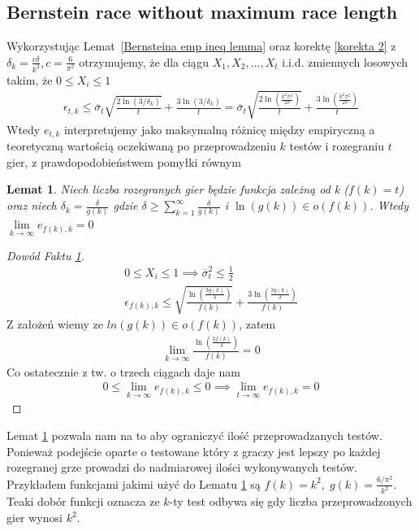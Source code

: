 \documentclass[inzynierska]{pwr_wmat_praca_dyplomowa}
\theoremstyle{plain}
\numberwithin{theorem}{chapter}
\newtheorem{lemma}[theorem]{Lemat}
\theoremstyle{definition}
\numberwithin{theorem}{chapter}
\begin{document}
	\subsection{Bernstein race without maximum race length}
	Wykorzystując Lemat~\ref{Bernsteina emp ineq lemma} oraz korektę \ref{korekta 2} z $\delta_k=\frac{c\delta}{k^2}, c=\frac{6}{\pi^2}$ otrzymujemy, że dla ciągu $X_1,X_2,\dots,X_t$ i.i.d. zmiennych losowych takim, że  $0 \le X_i \le 1$ 
	\begin{align*}
		\label{Bernstein race without maximum race length}
		\epsilon_{t,k} \le \overline{\sigma}_t \sqrt{\frac{2\ln(3/\delta_k)}{t}} + \frac{3  \ln{(3 / \delta_k)}}{t} =
		\overline{\sigma}_t\sqrt{\frac{2\ln(\frac{k^2\pi^2}{2\delta})}{t}} + \frac{3  \ln{(\frac{k^2\pi^2}{2\delta})}}{t}
	\end{align*}
	Wtedy $e_{t,k}$ interpretujemy jako maksymalną różnicę między empiryczną a teoretyczną wartością oczekiwaną po przeprowadzeniu $k$ testów i rozegraniu $t$ gier, z prawdopodobieństwem pomyłki równym 
	\begin{lemma}
		\label{lemma Bernstein race without maximum race length}
		Niech liczba rozegranych gier będzie funkcja zależną od k ($f(k) = t$) oraz niech $\delta_k = \frac{\delta}{g(k)}$
		gdzie $\delta \ge \sum_{k=1}^{\infty} \frac{\delta}{g(k)}$ i $\ln(g(k)) \in o(f(k))$. Wtedy
		$\lim\limits_{k\to\infty} e_{f(k),k} = 0$ 
	\end{lemma}
	\begin{proof}[Dowód Faktu \ref{lemma Bernstein race without maximum race length}]
		\begin{gather*}
			0\le X_i \le 1 \implies \overline{\sigma}_t^2 \le \frac{1}{2}\\
			\epsilon_{f(k), k} \le  \sqrt{\frac{\ln(\frac{3g(k)}{\delta})}{f(k)}} + \frac{3  \ln{(\frac{3g(k)}{\delta})}}{f(k)}
		\end{gather*}
		Z założeń wiemy ze $ln(g(k)) \in o(f(k))$, zatem
		\begin{gather*}
			\lim\limits_{k\to\infty} \frac{  \ln{(\frac{3f(k)}{\delta})}}{f(k)} = 0
		\end{gather*}
		Co ostatecznie z tw. o trzech ciągach daje nam
		\begin{gather*}
			0\le \lim\limits_{k\to\infty} e_{f(k), k} \le 0 \implies \lim\limits_{t\to\infty} e_{f(k), k} = 0
		\end{gather*}
	\end{proof}
	Lemat \ref{lemma Bernstein race without maximum race length} pozwala nam na to aby ograniczyć ilość przeprowadzanych testów. Ponieważ podejście oparte o testowane który z graczy jest lepszy po każdej rozegranej grze prowadzi do nadmiarowej ilości wykonywanych testów.
	Przykładem funkcjami jakimi użyć do Lematu \ref{lemma Bernstein race without maximum race length} są $f(k) = k^2,\; g(k) = \frac{6/\pi^2}{k^2}$. Teaki dobór funkcji oznacza ze $k$-ty test odbywa się gdy liczba przeprowadzonych gier wynosi $k^2$.
	
\end{document}
